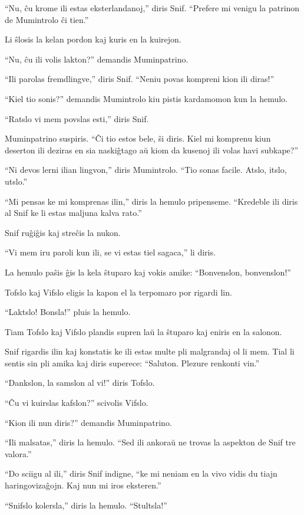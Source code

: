 ``Nu, ĉu krome ili estas eksterlandanoj,'' diris Snif. ``Prefere mi venigu la patrinon de Mumintrolo ĉi tien.''

Li ŝlosis la kelan pordon kaj kuris en la kuirejon.

``Nu, ĉu ili volis lakton?'' demandis Muminpatrino.

``Ili parolas fremdlingve,'' diris Snif. ``Neniu povas kompreni kion ili diras!''

``Kiel tio sonis?'' demandis Mumintrolo kiu pistis kardamomon kun la hemulo.

``Ratslo vi mem povslas esti,'' diris Snif.

Muminpatrino suspiris. ``Ĉi tio estos bele, ŝi diris. Kiel mi komprenu kiun deserton ili deziras en sia naskiĝtago aŭ kiom da kusenoj ili volas havi subkape?''

``Ni devos lerni ilian lingvon,'' diris Mumintrolo. ``Tio sonas facile. Atslo, itslo, utslo.''

``Mi pensas ke mi komprenas ilin,'' diris la hemulo pripenseme. ``Kredeble ili diris al Snif ke li estas maljuna kalva rato.''

Snif ruĝiĝis kaj streĉis la nukon.

``Vi mem iru paroli kun ili, se vi estas tiel sagaca,'' li diris.

La hemulo paŝis ĝis la kela ŝtuparo kaj vokis amike: ``Bonvenslon, bonvenslon!''

Tofslo kaj Vifslo eligis la kapon el la terpomaro por rigardi lin.

``Laktslo! Bonsla!'' pluis la hemulo.

Tiam Tofslo kaj Vifslo plandis supren laŭ la ŝtuparo kaj eniris en la salonon.

Snif rigardis ilin kaj konstatis ke ili estas multe pli malgrandaj ol li mem. Tial li sentis sin pli amika kaj diris superece: ``Saluton. Plezure renkonti vin.''

``Dankslon, la samslon al vi!'' diris Tofslo.

``Ĉu vi kuirslas kafslon?'' scivolis Vifslo.

``Kion ili nun diris?'' demandis Muminpatrino.

``Ili malsatas,'' diris la hemulo. ``Sed ili ankoraŭ ne trovas la aspekton de Snif tre valora.''

``Do sciigu al ili,'' diris Snif indigne, ``ke mi neniam en la vivo vidis du tiajn haringovizaĝojn. Kaj nun mi iros eksteren.''

``Snifslo kolersla,'' diris la hemulo. ``Stultsla!''

